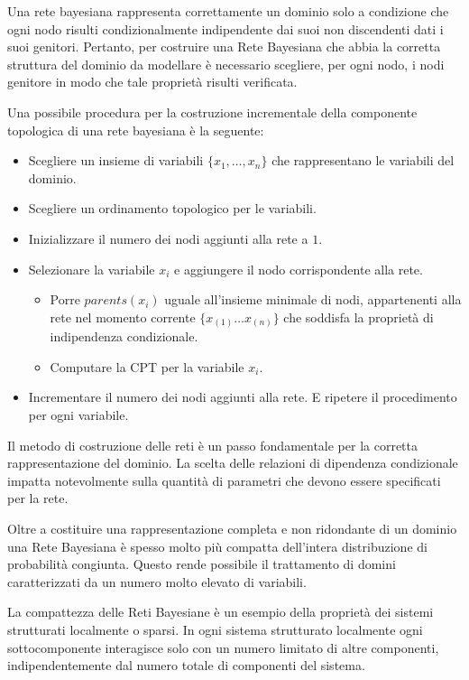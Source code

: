 Una rete bayesiana rappresenta correttamente un dominio solo a condizione che ogni
nodo risulti condizionalmente indipendente dai suoi non discendenti dati i suoi
genitori. Pertanto, per costruire una Rete Bayesiana che abbia la corretta
struttura del dominio da modellare è necessario scegliere, per ogni nodo, i nodi
genitore in modo che tale proprietà risulti verificata.

Una possibile procedura per la costruzione incrementale della componente topologica
di una rete bayesiana è la seguente:
\begin{itemize}
    \item Scegliere un insieme di variabili $\{x_1, \dots, x_n\}$ che rappresentano
          le variabili del dominio.
    \item Scegliere un ordinamento topologico per le variabili.
    \item Inizializzare il numero dei nodi aggiunti alla rete a $1$.
    \item Selezionare la variabile $x_i$ e aggiungere il nodo corrispondente alla
          rete.
          \begin{itemize}
              \item Porre $parents(x_i)$ uguale all'insieme minimale di nodi,
                    appartenenti alla rete nel momento corrente $\{x_{(1)} \dots x_{(n)}\}$
                    che soddisfa la proprietà di indipendenza condizionale.
              \item Computare la CPT per la variabile $x_i$.
          \end{itemize}
    \item Incrementare il numero dei nodi aggiunti alla rete. E ripetere il
          procedimento per ogni variabile.
\end{itemize}
Il metodo di costruzione delle reti è un passo fondamentale per la corretta
rappresentazione del dominio. La scelta delle relazioni di dipendenza condizionale
impatta notevolmente sulla quantità di parametri che devono essere specificati
per la rete.

Oltre a costituire una rappresentazione completa e non ridondante di un dominio
una Rete Bayesiana è spesso molto più compatta dell'intera distribuzione di
probabilità congiunta. Questo rende possibile il trattamento di domini
caratterizzati da un numero molto elevato di variabili.

La compattezza delle Reti Bayesiane è un esempio della proprietà dei sistemi
strutturati localmente o sparsi. In ogni sistema strutturato localmente ogni
sottocomponente interagisce solo con un numero limitato di altre componenti,
indipendentemente dal numero totale di componenti del sistema.

